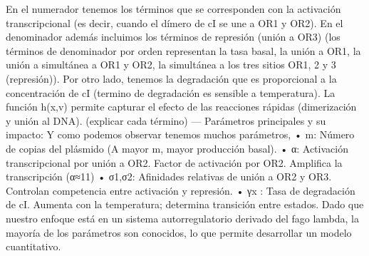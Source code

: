 En el numerador tenemos los términos que se corresponden con la activación transcripcional (es decir, cuando el dímero de cI se une a OR1 y OR2). En el denominador además incluimos los términos de represión (unión a OR3) (los términos de denominador por orden representan la tasa basal, la unión a OR1, la unión a simultánea a OR1 y OR2, la simultánea a los tres sitios OR1, 2 y 3 (represión)).
Por otro lado, tenemos la degradación que es proporcional a la concentración de cI (termino de degradación es sensible a temperatura).
La función h(x,v) permite capturar el efecto de las reacciones rápidas (dimerización y unión al DNA). (explicar cada término)
---
Parámetros principales y su impacto:
Y como podemos observar tenemos muchos parámetros,
•	m: Número de copias del plásmido (A mayor m, mayor producción basal).
•	α: Activación transcripcional por unión a OR2. Factor de activación por OR2. Amplifica la transcripción (α≈11)
•	σ1,σ2: Afinidades relativas de unión a OR2 y OR3. Controlan competencia entre activación y represión.
•	γx : Tasa de degradación de cI. Aumenta con la temperatura; determina transición entre estados.
Dado que nuestro enfoque está en un sistema autorregulatorio derivado del fago lambda, la mayoría de los parámetros son conocidos, lo que permite desarrollar un modelo cuantitativo.


